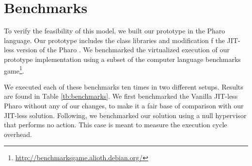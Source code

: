 %

\section{Benchmarks}

To verify the feasibility of this model, we built our \Vtt prototype in the Pharo language. Our prototype includes the \Vtt class libraries and modification f the JIT-less version of the Pharo \VM.
We benchmarked the virtualized execution of our prototype implementation using a subset of the computer language benchmarks game\footnote{\url{http://benchmarksgame.alioth.debian.org/}}.

We executed each of these benchmarks ten times in two different setups. Results are found in Table \ref{tb:benchmarks}. We first benchmarked the Vanilla JIT-less Pharo \VM without any of our changes, to make it a fair base of comparison with our JIT-less solution. Following, we benchmarked our solution using a null hypervisor that performs no action. This case is meant to measure the execution cycle overhead.



